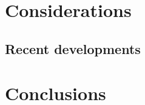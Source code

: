 \documentclass[twoside,twocolumn]{article}
\begin{document}

\section{Considerations}

\subsection{Recent developments}



\section{Conclusions}


\end{document}
